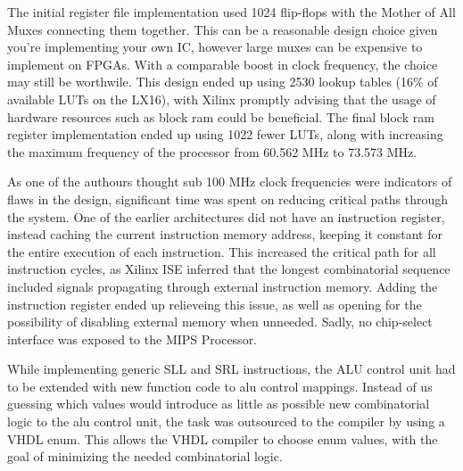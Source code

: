 The initial register file implementation used 1024 flip-flops with the Mother of All Muxes connecting them together.
This can be a reasonable design choice given you're implementing your own IC, however large muxes can be expensive to implement on FPGAs.
With a comparable boost in clock frequency, the choice may still be worthwile.
This design ended up using 2530 lookup tables (16\% of available LUTs on the LX16), with Xilinx promptly advising that the usage of hardware resources such as block ram could be beneficial.
The final block ram register implementation ended up using 1022 fewer LUTs, along with increasing the maximum frequency of the processor from 60.562 MHz to 73.573 MHz.

As one of the authours thought sub 100 MHz clock frequencies were indicators of flaws in the design, significant time was spent on reducing critical paths through the system.
One of the earlier architectures did not have an instruction register, instead caching the current instruction memory address, keeping it constant for the entire execution of each instruction.
This increased the critical path for all instruction cycles, as Xilinx ISE inferred that the longest combinatorial sequence included signals propagating through external instruction memory.
Adding the instruction register ended up relieveing this issue, as well as opening for the possibility of disabling external memory when unneeded.
Sadly, no chip-select interface was exposed to the MIPS Processor.

While implementing generic SLL and SRL instructions, the ALU control unit had to be extended with new function code to alu control mappings.
Instead of us guessing which values would introduce as little as possible new combinatorial logic to the alu control unit, the task was outsourced to the compiler by using a VHDL enum.
This allows the VHDL compiler to choose enum values, with the goal of minimizing the needed combinatorial logic.
